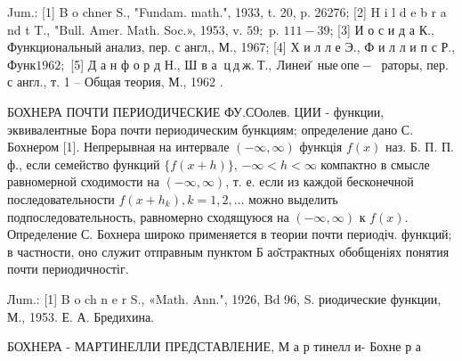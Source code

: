 \documentclass[10pt]{article}
\begin{document}
Jum.: [1] B o chner S., "Fundam. math.", 1933, t. 20, p. 26276; [2] H i l d e b r a nd t T., "Bull. Amer. Math. Soc.», 1953, v. $59 ;$ p. $111-39$; [3] И о с и д а К., Функциональный анализ, пер. с англ,, М., 1967; [4] Х и л л е Э., Ф и л л и п с Р., Функ$1962 ;$ [5] Д а н ф о р д Н., Ш в а $\mathbf{~ ц ~ д ~ ж . ~ Т . , ~ Л и н е и ̆ н ы е ~ о п е - ~}$ раторы, пер. с англ., т. 1 -- Общая теория, М., 1962 .



БОХНЕРА ПОЧТИ ПЕРИОДИЧЕСКИЕ ФУ.СОолев. ЦИИ - функции, эквивалентные Бора почти периодическим бункциям; определение дано С. Бохнером [1]. Непрерывная на интервале $(-\infty, \infty)$ функція $f(x)$ наз. Б. П. П. ф., если семейство функций $\{f(x+h)\}$, $-\infty<h<\infty$ компактно в смысле равномерной сходимости на $(-\infty, \infty)$, т. е. если из каждой бесконечной последовательности $f\left(x+h_{k}\right), k=1,2, \ldots$ можно выделить подпоследовательность, равномерно сходящуюся на $(-\infty, \infty)$ к $f(x)$. Определение С. Бохнера широко применяется в теории почти периодіч. функций; в частности, оно служит отправным пунктом Б ао̆страктных обобщеніях понятия почти периодичностіг.



Лum.: [1] B o ch n e r S., «Math. Ann.", 1926, Bd 96, S. риодические функции, М., 1953. Е. А. Бредихина.



БОХНЕРА - МАРТИНЕЛЛИ ПРЕДСТАВЛЕНИЕ, М а р тинелл и- Бохне р а
\end{document}
